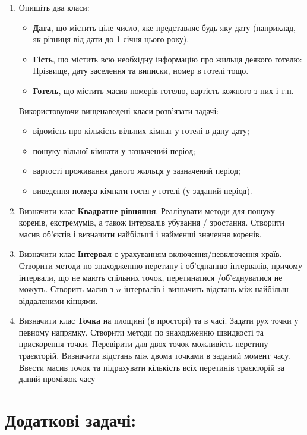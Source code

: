 \documentclass[a5paper,titlepage,openany,twoside,
]
{book_unv}%
\begin{document}
\begin{enumerate}
\begin{enumerate}
\begin{enumerate}
\item
Опишіть два класи:
\begin{itemize}
\item
\textbf{Дата}, що містить ціле число, яке представляє будь-яку дату
(наприклад, як різниця від дати до 1 січня цього року).
\item
\textbf{Гість}, що містить всю необхідну інформацію про жильця
деякого готелю: Прізвище, дату заселення та виписки, номер в готелі тощо.
\item
\textbf{Готель}, що містить масив номерів готелю, вартість кожного з них і т.п.
\end{itemize}
Використовуючи вищенаведені класи розв'язати задачі:
\begin{itemize}
\item відомість про кількість вільних кімнат у готелі в дану дату;
\item пошуку вільної кімнати у зазначений період;
\item вартості проживання даного жильця у зазначений період;
\item виведення номера кімнати гостя у готелі (у заданий період).
\end{itemize}

\item
Визначити клас \textbf{Квадратне рівняння}. Реалізувати методи для пошуку коренів,
екстремумів, а також інтервалів убування / зростання. Створити масив об'єктів і 
визначити найбільші і найменші значення коренів.
\item
Визначити клас \textbf{Інтервал} с урахуванням включення/невключення країв. 
Створити методи по знаходженню перетину і об'єднанню інтервалів, 
причому інтервали, що не мають спільних точок, перетинатися /об'єднуватися не можуть. 
Створить масив з $n$ інтервалів і визначить відстань між найбільш віддаленими кінцями.

\item
Визначити клас \textbf{Точка} на площині (в просторі) та в часі. 
Задати рух точки у певному напрямку. Створити методи по знаходженню швидкості та прискорення точки. 
Перевірити для двох точок можливість перетину траєкторій. 
Визначити відстань між двома точками в заданий момент часу.
Ввести масив точок та підрахувати кількість всіх перетинів траєкторій за даний проміжок часу

\end{enumerate}

\section{Додаткові задачі:}


\end{enumerate}
\end{enumerate}
\end{document}
